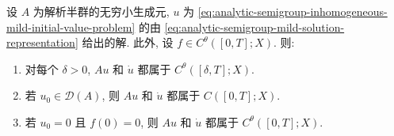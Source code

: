 \begin{Theorem}
\label{thm:analytic-mild-holder-regularity}
设 $A$ 为解析半群的无穷小生成元, $u$ 为 \eqref{eq:analytic-semigroup-inhomogeneous-mild-initial-value-problem} 的由 \eqref{eq:analytic-semigroup-mild-solution-representation} 给出的解. 此外, 设 $f\in C^\theta([0,T];X)$. 则:\begin{enumerate}\item\label{concl:analytic-mild-regularity-away-from-zero} 对每个 $\delta>0$, $Au$ 和 $\dot u$ 都属于 $C^\theta([\delta,T];X)$.\item\label{concl:analytic-mild-regularity-continuity-at-zero} 若 $u_0\in\mathcal{D}(A)$, 则 $Au$ 和 $\dot u$ 都属于 $C([0,T];X)$.\item\label{concl:analytic-mild-regularity-zero-compatible-holder} 若 $u_0=0$ 且 $f(0)=0$, 则 $Au$ 和 $\dot u$ 都属于 $C^\theta([0,T];X)$.\end{enumerate}
\end{Theorem}


